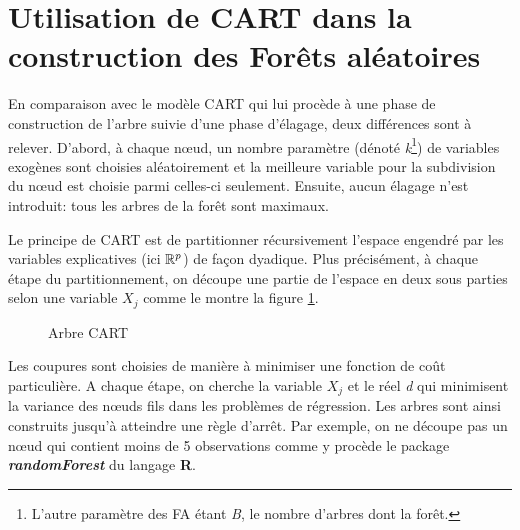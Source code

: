 \section{Utilisation de CART dans la construction des Forêts aléatoires}
En comparaison avec le modèle CART qui lui procède à une phase de construction de l'arbre suivie d'une phase d'élagage, deux différences sont à relever. D'abord, à chaque nœud, un nombre paramètre (dénoté \textit{k}\footnote{L'autre paramètre des FA étant \textit{B}, le nombre d'arbres dont la forêt.}) de variables exogènes sont choisies aléatoirement et la meilleure variable pour la subdivision du nœud est choisie parmi celles-ci seulement. Ensuite, aucun élagage n'est introduit: tous les arbres de la forêt sont maximaux.\par
	Le principe de CART est de partitionner récursivement l’espace engendré par les variables explicatives (ici $\mathbb{R}^p$) de façon dyadique. Plus précisément, à
	chaque étape du partitionnement, on découpe une partie de l’espace en deux sous parties selon une variable $X_j$ comme le montre la figure \ref{fig:CART}.
	\begin{figure}[h]
	    		\centering
	    		\caption{Arbre CART}
	    		\label{fig:CART}
	\end{figure}
	\par
	Les coupures sont choisies de manière à minimiser une fonction de coût particulière. A chaque étape, on cherche la variable $X_j$ et le réel \textit{d} qui minimisent la variance des nœuds fils dans les problèmes de régression. Les arbres sont ainsi construits jusqu’à atteindre une règle d’arrêt. Par exemple, on ne découpe pas un nœud qui contient moins de 5 observations comme y procède le package \textbf{\textit{randomForest}} du langage \textbf{R}.\par
